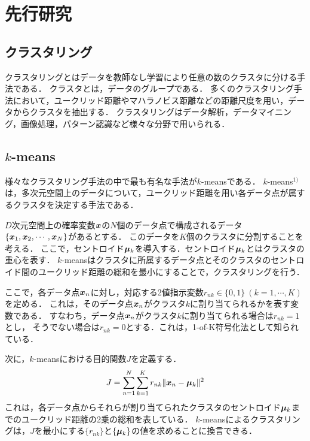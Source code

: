 \section{先行研究}

\subsection{クラスタリング}
クラスタリングとはデータを教師なし学習により任意の数のクラスタに分ける手法である．
クラスタとは，データのグループである．
多くのクラスタリング手法において，ユークリッド距離やマハラノビス距離などの距離尺度を用い，データからクラスタを抽出する．
クラスタリングはデータ解析，データマイニング，画像処理，パターン認識など様々な分野で用いられる．

\subsection{$k$-means}
様々なクラスタリング手法の中で最も有名な手法が$k$-meansである．
$k$-means$^{1)}$は，多次元空間上のデータについて，ユークリッド距離を用い各データ点が属するクラスタを決定する手法である．

$D$次元空間上の確率変数$\boldsymbol{x}$の$N$個のデータ点で構成されるデータ
$\{\boldsymbol{x}_1, \boldsymbol{x}_2, \cdots, \boldsymbol{x}_N\}$があるとする．
このデータを$K$個のクラスタに分割することを考える．
ここで，セントロイド$\boldsymbol{\mu}_k$を導入する．セントロイド$\boldsymbol{\mu}_k$とはクラスタの重心を表す．
$k$-meansはクラスタに所属するデータ点とそのクラスタのセントロイド間のユークリッド距離の総和を最小にすることで，クラスタリングを行う．

ここで，各データ点$\boldsymbol{x}_n$に対し，対応する2値指示変数$r_{nk} \in \{0, 1\}\ (k = 1, \cdots, K)$を定める．
これは，そのデータ点$\boldsymbol{x}_n$がクラスタ$k$に割り当てられるかを表す変数である．
すなわち，データ点$\boldsymbol{x}_n$がクラスタ$k$に割り当てられる場合は$r_{nk}=1$とし，
そうでない場合は$r_{nk}=0$とする．これは，1-of-K符号化法として知られている．

次に，$k$-meansにおける目的関数$J$を定義する．
\begin{align}
  \label{eq:J-func}
  J = \sum_{n=1}^{N} \sum_{k=1}^{K} r_{nk} \| {\displaystyle \boldsymbol{x}_n - \boldsymbol{\mu}_k} \|^2
\end{align}
これは，各データ点からそれらが割り当てられたクラスタのセントロイド$\boldsymbol{\mu}_k$までのユークリッド距離の2乗の総和を表している．%
$k$-meansによるクラスタリングは，$J$を最小にする$\{r_{nk}\}$と$\{\boldsymbol{\mu}_k\}$の値を求めることに換言できる．

